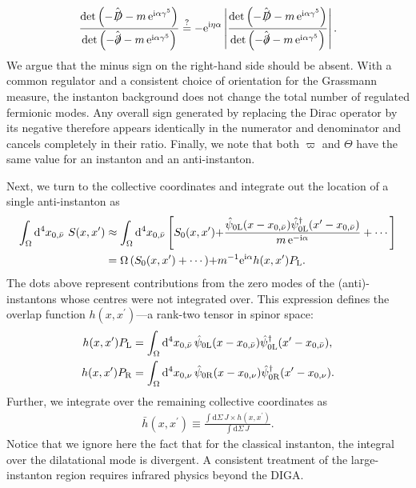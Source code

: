 \documentclass[review]{elsarticle}
\numberwithin{equation}{section}
\numberwithin{table}{section}
\numberwithin{figure}{section}
\def\d{\mathrm{d}}
\def\i{\mathrm{i}}
\def\e{\mathrm{e}}
\begin{document}
\begin{align}
    \frac{\det\left(-\hat{\slashed{D}}-m\,\e^{\i\alpha\gamma^5}\right)}{\det\left(-\hat{\slashed{\partial}} -m\,\e^{\i\alpha\gamma^5} \right)}\overset{?}{=}-\e^{\i\eta\alpha}\left|\frac{\det\left( -\hat{\slashed{D}}-m\,\e^{\i\alpha\gamma^5}\right)}{\det\left(-\hat{\slashed{\partial}}-m\,\e^{\i\alpha\gamma^5}\right)}\right|. 
    \label{eq:fermion-determinant-ratio-incorrect}
\end{align}
We argue that the minus sign on the right-hand side should be absent. With a common regulator and a consistent choice of orientation for the Grassmann measure, the instanton background does not change the total number of regulated fermionic modes. Any overall sign generated by replacing the Dirac operator by its negative therefore appears identically in the numerator and denominator and cancels completely in their ratio. Finally, we note that both $\varpi$ and $\Theta$ have the same value for an instanton and an anti-instanton.

Next, we turn to the collective coordinates and integrate out the location of a single anti-instanton as
\begin{align}
\begin{aligned}
    \int_{\Omega}{\rm d}^4 x_{0,\bar\nu}\ S(x,x^\prime) &\approx  \int_{\Omega}{\rm d}^4 x_{0,\bar\nu} \left[S_{0}(x,x^\prime) {+}\frac{\hat\psi_{0{\rm L}}(x-x_{0,\bar\nu})\hat\psi_{0{\rm L}}^\dagger(x^\prime-x_{0,\bar\nu})}{m\, {\rm e}^{-{\rm i}\alpha}}+\cdots\right]\\
   &= \Omega\,(S_{0}(x,x^\prime)+\cdots){ +} m^{-1} {\rm e}^{{\rm i}\alpha} h(x,x^\prime)P_{\rm L}.
\end{aligned}
\end{align}
The dots above represent contributions from the zero modes of the (anti)-instantons whose centres were not integrated over. This expression defines the overlap function $h(x,x^\prime)$---a rank-two tensor in spinor space:
\begin{align}
    h(x,x^\prime)P_{\rm L} &= \int_{\Omega}{\rm d}^4 x_{0,\bar\nu}\,\hat\psi_{0{\rm L}}(x-x_{0,\bar\nu}) \hat\psi_{0 {\rm L}}^\dagger(x^\prime-x_{0,\bar\nu}),\\ 
    h(x,x^\prime)P_{\rm R} &= \int_{\Omega}{\rm d}^4 x_{0,\nu}\,\hat\psi_{0{\rm R}}(x-x_{0,\nu}) \hat\psi_{0{\rm R}}^\dagger(x^\prime-x_{0,\nu}).
\end{align}
Further, we integrate over the remaining collective coordinates as
\begin{align}
    \bar h(x,x^\prime)\equiv \frac{\int \d\Sigma \, J\times  h(x,x^\prime)}{\int \d\Sigma\, J}.
\end{align}
Notice that we ignore here the fact that for the classical instanton, the integral over the dilatational mode is divergent. A consistent treatment of the large-instanton region requires infrared physics beyond the DIGA.
\end{document}
